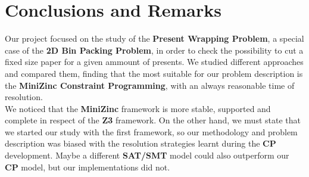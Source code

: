 \chapter{Conclusions and Remarks}
Our project focused on the study of the \textbf{Present Wrapping Problem}, a special case of the \textbf{2D Bin Packing Problem}, in order to check the
possibility to cut a fixed size paper for a given ammount of presents. We studied different approaches and compared them, finding that the most suitable
for our problem description is the \textbf{MiniZinc Constraint Programming}, with an always reasonable time of resolution.\\

We noticed that the \textbf{MiniZinc} framework is more stable, supported and complete in respect of the \textbf{Z3} framework. On the other hand,
we must state that we started our study with the first framework, so our methodology and problem description was biased with the resolution strategies
learnt during the \textbf{CP} development. Maybe a different \textbf{SAT/SMT} model could also outperform our \textbf{CP} model, but our implementations did not.